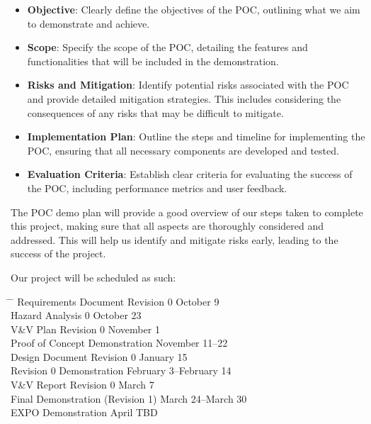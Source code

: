 \documentclass{article}
\begin{document}
\begin{itemize}
    \item \textbf{Objective}: Clearly define the objectives of the POC, outlining what we aim to demonstrate and achieve.
    \item \textbf{Scope}: Specify the scope of the POC, detailing the features and functionalities that will be included in the demonstration.
    \item \textbf{Risks and Mitigation}: Identify potential risks associated with the POC and provide detailed mitigation strategies. This includes considering the consequences of any risks that may be difficult to mitigate.
    \item \textbf{Implementation Plan}: Outline the steps and timeline for implementing the POC, ensuring that all necessary components are developed and tested.
    \item \textbf{Evaluation Criteria}: Establish clear criteria for evaluating the success of the POC, including performance metrics and user feedback.
\end{itemize}

The POC demo plan will provide a good overview of our steps taken to complete this project, making sure that all aspects are thoroughly considered and addressed. This will help us identify and mitigate risks early, leading to the success of the project.

Our project will be scheduled as such: \\

\begin{tabbing}
  \hspace{8cm} \= \hspace{3cm} \= \kill
  Requirements Document Revision 0 \> October 9 \\
  Hazard Analysis 0 \> October 23 \\
  V\&V Plan Revision 0 \> November 1 \\
  Proof of Concept Demonstration \> November 11--22 \\
  Design Document Revision 0 \> January 15 \\
  Revision 0 Demonstration \> February 3--February 14 \\
  V\&V Report Revision 0 \> March 7 \\
  Final Demonstration (Revision 1) \> March 24--March 30 \\
  EXPO Demonstration \> April TBD \\
\end{tabbing}
\end{document}
